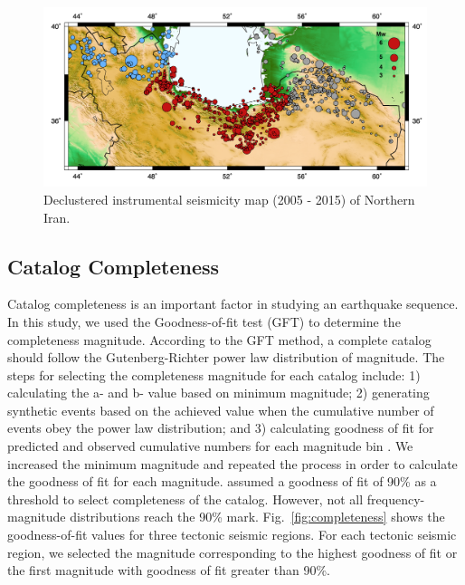\begin{figure} [ht]
\centering
\includegraphics[scale=0.6]{figures/pdf/Figure02.pdf} 
\caption{Declustered instrumental seismicity map (2005 - 2015) of Northern Iran.}
\label{fig:seismicity}
\end{figure}


 
\subsection{Catalog Completeness}
\noindent
Catalog completeness is an important factor in studying an earthquake sequence.  In this study, we used the Goodness-of-fit test (GFT) \citep{Wiemer2000} to determine the completeness magnitude. According to the GFT method, a complete catalog should follow the Gutenberg-Richter power law distribution of magnitude. The steps for selecting the completeness magnitude for each catalog include: 1) calculating the a-  and  b-  value based on minimum magnitude; 2) generating  synthetic events based on the achieved value when the cumulative number of events obey the power law distribution; and 3) calculating goodness of fit for predicted and observed cumulative numbers for each magnitude bin  \citep{Wiemer2000}. We increased the minimum magnitude and repeated the process in order to calculate the goodness of fit for each magnitude.  \citet{Wiemer2000} assumed a goodness of fit of 90\% as a threshold to select completeness of the catalog. However,  not all frequency-magnitude distributions reach the 90\% mark. Fig.~\ref{fig:completeness} shows the goodness-of-fit values for three tectonic seismic regions. For each tectonic seismic region, we selected the magnitude corresponding to the highest goodness of fit or the first magnitude with goodness of fit greater than 90\%.

